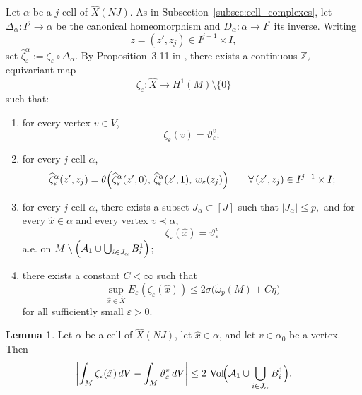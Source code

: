 \documentclass[12pt,english]{article}
\theoremstyle{definition}
\newtheorem{lemma}[theorem]{Lemma}
\begin{document}
Let \(\alpha\) be a
\(j\)-cell of \(\widehat X(NJ)\). As in Subsection~\ref{subsec:cell_complexes}, let $\Delta_\alpha:I^j\to \alpha$ be the canonical homeomorphism and \(D_\alpha:\alpha\to I^j\) its inverse. Writing
\[
z=(z',z_j)\in I^{j-1}\times I,
\]
set $\widehat\zeta^\alpha_\varepsilon:=\zeta_\varepsilon\circ \Delta_\alpha$. By Proposition~3.11 in \cite{Dey}, there exists a continuous \(\mathbb{Z}_2\)-equivariant map
\[
\zeta_\varepsilon:\widehat X\to H^1(M)\setminus\{0\}
\]
such that:
\begin{enumerate}
\item[(i)] for every vertex \(v\in V\),
\[
\zeta_\varepsilon(v)=\vartheta_\varepsilon^v;
\]
\item[(ii)] for every \(j\)-cell \(\alpha\),
\begin{equation}\label{eq:cellwise_theta_recursion}
\widehat\zeta^\alpha_\varepsilon(z',z_j)
=
\theta\Bigl(
\widehat\zeta^\alpha_\varepsilon(z',0),\,
\widehat\zeta^\alpha_\varepsilon(z',1),\,
w_\varepsilon(z_j)
\Bigr)
\qquad\forall\,(z',z_j)\in I^{j-1}\times I;
\end{equation}
\item[(iii)] for every \(j\)-cell \(\alpha\), there exists a subset \(J_\alpha\subset [J]\) such that $|J_\alpha|\le p,$
and for every \(\hat x\in \alpha\) and every vertex \(v\prec \alpha\),
\begin{equation}\label{eq:gluing_vertex_agreement_outside_bad_set}
\zeta_\varepsilon(\hat x)=\vartheta_\varepsilon^v
\end{equation}
a.e. on $M\setminus\Bigl(\mathcal A_1\cup \bigcup_{i\in J_\alpha} B_i^1\Bigr)$;
\item[(iv)] there exists a constant \(C<\infty\) such that
\begin{equation}\label{eq:glued_family_energy_bound}
\sup_{\hat x\in\widehat X} E_\varepsilon(\zeta_\varepsilon(\hat x))
\le
2\sigma\bigl(\tilde\omega_p(M)+C\eta\bigr)
\end{equation}
for all sufficiently small \(\varepsilon>0\).
\end{enumerate}

\begin{lemma}\label{lem:mean_defect_gluing_step}
Let \(\alpha\) be a cell of \(\widehat X(NJ)\), let \(\hat x\in \alpha\), and let \(v\in \alpha_0\) be a vertex.
Then
\[
\left|
\int_M \zeta_\varepsilon(\hat x)\,dV
-
\int_M \vartheta_\varepsilon^v\,dV
\right|
\le
2\,\operatorname{Vol}\!\Bigl(\mathcal A_1\cup \bigcup_{i\in J_\alpha} B_i^1\Bigr).
\]
\end{lemma}
\end{document}
